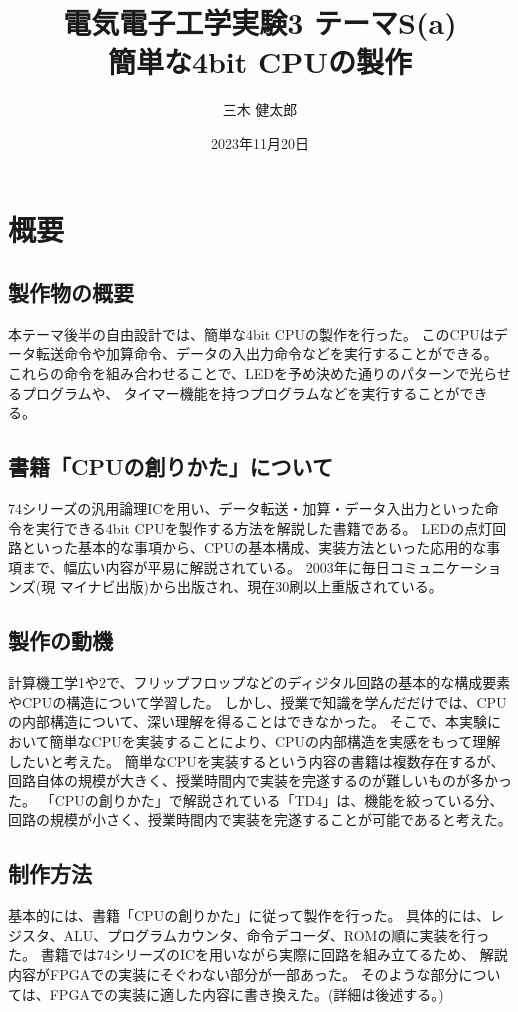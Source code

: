 \documentclass[dvipdfmx,a4j, titlepage]{jsarticle}
\title{電気電子工学実験3 テーマS(a)\\ 簡単な4bit CPUの製作}
\author{三木 健太郎}
\date{2023年11月20日}
\begin{document}
\maketitle

\section{概要}
\subsection{製作物の概要}
本テーマ後半の自由設計では、簡単な4bit CPUの製作を行った。
このCPUはデータ転送命令や加算命令、データの入出力命令などを実行することができる。
これらの命令を組み合わせることで、LEDを予め決めた通りのパターンで光らせるプログラムや、
タイマー機能を持つプログラムなどを実行することができる。

\subsection{書籍「CPUの創りかた」について}
74シリーズの汎用論理ICを用い、データ転送・加算・データ入出力といった命令を実行できる4bit CPUを製作する方法を解説した書籍である。
LEDの点灯回路といった基本的な事項から、CPUの基本構成、実装方法といった応用的な事項まで、幅広い内容が平易に解説されている。
2003年に毎日コミュニケーションズ(現 マイナビ出版)から出版され、現在30刷以上重版されている。

\subsection{製作の動機}
計算機工学1や2で、フリップフロップなどのディジタル回路の基本的な構成要素やCPUの構造について学習した。
しかし、授業で知識を学んだだけでは、CPUの内部構造について、深い理解を得ることはできなかった。
そこで、本実験において簡単なCPUを実装することにより、CPUの内部構造を実感をもって理解したいと考えた。
簡単なCPUを実装するという内容の書籍は複数存在するが、回路自体の規模が大きく、授業時間内で実装を完遂するのが難しいものが多かった。
「CPUの創りかた」で解説されている「TD4」は、機能を絞っている分、回路の規模が小さく、授業時間内で実装を完遂することが可能であると考えた。

\subsection{制作方法}
基本的には、書籍「CPUの創りかた」に従って製作を行った。
具体的には、レジスタ、ALU、プログラムカウンタ、命令デコーダ、ROMの順に実装を行った。
書籍では74シリーズのICを用いながら実際に回路を組み立てるため、
解説内容がFPGAでの実装にそぐわない部分が一部あった。
そのような部分については、FPGAでの実装に適した内容に書き換えた。(詳細は後述する。)
\end{document}
